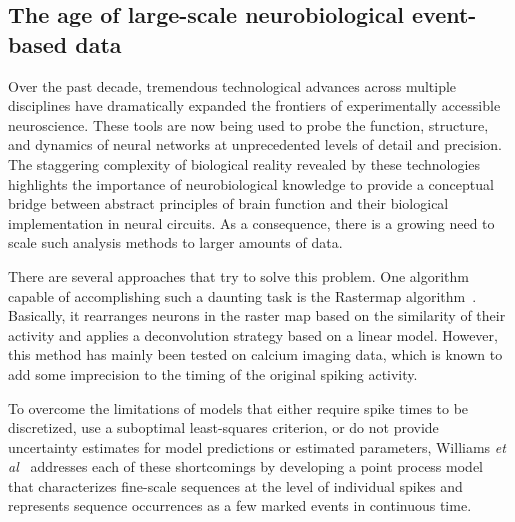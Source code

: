 \documentclass[runningheads]{llncs}
\begin{document}
\subsection{The age of large-scale neurobiological event-based data}
% 
Over the past decade, tremendous technological advances across multiple disciplines have dramatically expanded the frontiers of experimentally accessible neuroscience. %
These tools are now being used to probe the function, structure, and dynamics of neural networks at unprecedented levels of detail and precision. The staggering complexity of biological reality revealed by these technologies highlights the importance of neurobiological knowledge to provide a conceptual bridge between abstract principles of brain function and their biological implementation in neural circuits. As a consequence, there is a growing need to scale such analysis methods to larger amounts of data. 

There are several approaches that try to solve this problem. One algorithm capable of accomplishing such a daunting task is the Rastermap algorithm~\cite{pachitariu_robustness_2018}. Basically, it rearranges neurons in the raster map based on the similarity of their activity and applies a deconvolution strategy based on a linear model. However, this method has mainly been tested on calcium imaging data, which is known to add some imprecision to the timing of the original spiking activity. 

To overcome the limitations of models that either require spike times to be discretized, use a suboptimal least-squares criterion, or do not provide uncertainty estimates for model predictions or estimated parameters, Williams {\it et al}~\cite{williams_point_2020} addresses each of these shortcomings by developing a point process model that characterizes fine-scale sequences at the level of individual spikes and represents sequence occurrences as a few marked events in continuous time. %
%
\end{document}
